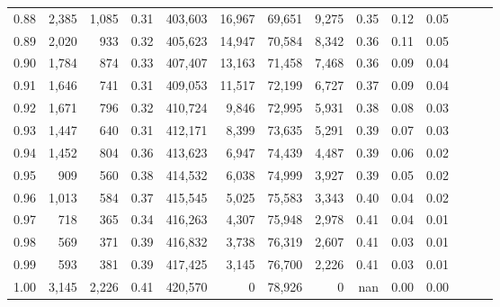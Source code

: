 \begin{tabular}{rrrrrrrrrrrrrr}
0.88 &   2,385 &  1,085 &  0.31 &  403,603 &   16,967 &  69,651 &   9,275 &  0.35 &  0.12 &      0.05 \\
0.89 &   2,020 &    933 &  0.32 &  405,623 &   14,947 &  70,584 &   8,342 &  0.36 &  0.11 &      0.05 \\
0.90 &   1,784 &    874 &  0.33 &  407,407 &   13,163 &  71,458 &   7,468 &  0.36 &  0.09 &      0.04 \\
0.91 &   1,646 &    741 &  0.31 &  409,053 &   11,517 &  72,199 &   6,727 &  0.37 &  0.09 &      0.04 \\
0.92 &   1,671 &    796 &  0.32 &  410,724 &    9,846 &  72,995 &   5,931 &  0.38 &  0.08 &      0.03 \\
0.93 &   1,447 &    640 &  0.31 &  412,171 &    8,399 &  73,635 &   5,291 &  0.39 &  0.07 &      0.03 \\
0.94 &   1,452 &    804 &  0.36 &  413,623 &    6,947 &  74,439 &   4,487 &  0.39 &  0.06 &      0.02 \\
0.95 &     909 &    560 &  0.38 &  414,532 &    6,038 &  74,999 &   3,927 &  0.39 &  0.05 &      0.02 \\
0.96 &   1,013 &    584 &  0.37 &  415,545 &    5,025 &  75,583 &   3,343 &  0.40 &  0.04 &      0.02 \\
0.97 &     718 &    365 &  0.34 &  416,263 &    4,307 &  75,948 &   2,978 &  0.41 &  0.04 &      0.01 \\
0.98 &     569 &    371 &  0.39 &  416,832 &    3,738 &  76,319 &   2,607 &  0.41 &  0.03 &      0.01 \\
0.99 &     593 &    381 &  0.39 &  417,425 &    3,145 &  76,700 &   2,226 &  0.41 &  0.03 &      0.01 \\
1.00 &   3,145 &  2,226 &  0.41 &  420,570 &        0 &  78,926 &       0 &   nan &  0.00 &      0.00 \\
\bottomrule
\end{tabular}
